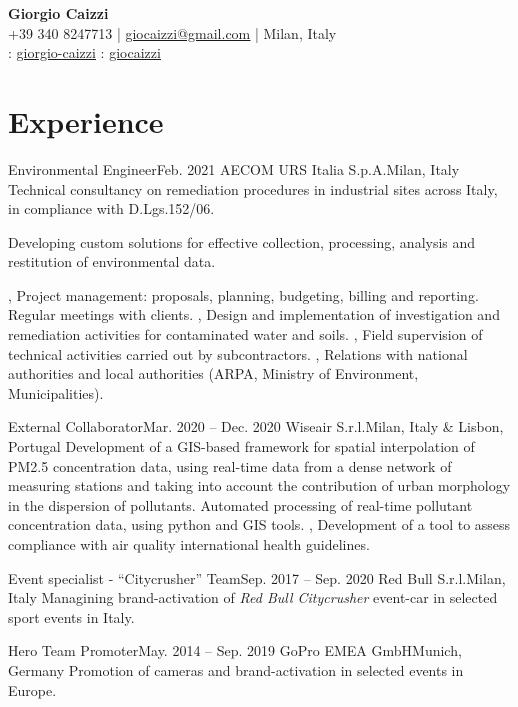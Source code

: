 \documentclass[letterpaper,11pt]{article}
\begin{document}
\begin{center}
  \textbf{\Huge \bfseries Giorgio Caizzi} \\
  \vspace{3pt}
  \small +39 340 8247713 | \href{mailto:giocaizzi@gmail.com}{\underline{giocaizzi@gmail.com}}
  | Milan, Italy\\
  \vspace{3pt}
  \faLinkedinSquare{} : \href{https://linkedin.com/in/giorgio-caizzi/}{\underline{giorgio-caizzi}}
  \faGithubSquare{} : \href{https://www.github.com/giocaizzi/}{\underline{giocaizzi}}\\
\end{center}
\vspace{-30pt}

\section{Experience}
\begin{sectionElementsList}
  \experienceElement
  {Environmental Engineer}{Feb. 2021}
  {AECOM URS Italia S.p.A.}{Milan, Italy}
  {
    Technical consultancy on remediation procedures in industrial sites across Italy, in compliance with D.Lgs.152/06.
  }{

    {
        Developing custom solutions for effective collection, processing, analysis and restitution of environmental data.

      },
    {
        Project management: proposals, planning, budgeting, billing and reporting. Regular meetings with clients.
      },
    {
        Design and implementation of investigation and remediation activities for contaminated water and soils.
      },
    {
        Field supervision of technical activities carried out by subcontractors.
      },
    {
        Relations with national authorities and local authorities  (ARPA, Ministry of Environment, Municipalities).
      }
  }
  \experienceElement
  {External Collaborator}{Mar. 2020 -- Dec. 2020}
  {Wiseair S.r.l.}{Milan, Italy \& Lisbon, Portugal}
  {
    Development of a GIS-based framework for spatial interpolation of PM2.5 concentration
    data, using real-time data from a dense network of measuring stations and taking into account the contribution of
    urban morphology in the dispersion of pollutants.
  }
  {
    {
        Automated processing of real-time pollutant concentration data, using python and GIS tools.
      },
    {
        Development of a tool to assess compliance with air quality international health guidelines.
      }
  }

  \experienceElement
  {Event specialist - “Citycrusher” Team}{Sep. 2017 -- Sep. 2020}
  {Red Bull S.r.l.}{Milan, Italy}
  {Managining brand-activation of \textit{Red Bull Citycrusher} event-car in selected sport
    events in Italy.}
  {}

  \experienceElement
  {Hero Team Promoter}{May. 2014 -- Sep. 2019}
  {GoPro EMEA GmbH}{Munich, Germany}
  {Promotion of cameras and brand-activation in selected events in Europe.}
  {}
\end{sectionElementsList}
\end{document}
